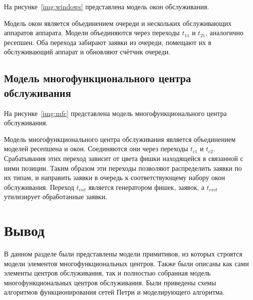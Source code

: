 На рисунке~\ref{img:windows} представлена модель окон обслуживания.

\FloatBarrier

Модель окон является объединением очереди и нескольких обслуживающих аппаратов аппарата. Модели объединяются через переходы $t_{11}$ и $t_{21}$, аналогично ресепшен. Оба перехода забирают заявки из очереди, помещают их в обслуживающий аппарат и обновляют счётчик очереди.

\subsection{Модель многофункционального центра обслуживания}

На рисунке~\ref{img:mfc} представлена модель многофункционального центра обслуживания.

\FloatBarrier

Модель многофункционального центра обслуживания является объединением моделей ресепшена и окон. Соединяются они через переходы $t_{c1}$ и $t_{c2}$. Срабатывания этих переход зависит от цвета фишки находящейся в связанной с ними позиции. Таким образом эти переходы позволяют распределить заявки по их типам, и направить заявки в очередь к соответствующему набору окон обслуживания. Переход $t_{ent}$ является генератором фишек, заявок, а $t_{exit}$ утилизирует обработанные заявки.

\section*{Вывод}

В данном разделе были представлены модели примитивов, из которых строятся модели элементов многофункциональных центров. Также были описаны как сами элементы центров обслуживания, так и полностью собранная модель  многофункциональных центров обслуживания. Были приведены схемы алгоритмов функционирования сетей Петри и моделирующего алгоритма. 